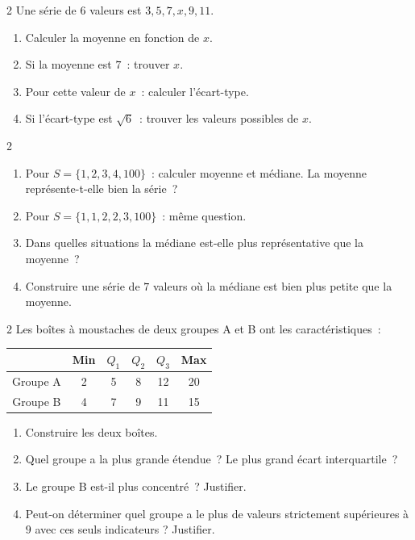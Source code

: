 \begin{exo}{2}
Une s\'erie de $6$ valeurs est $3, 5, 7, x, 9, 11$.
\begin{enumerate}
  \item Calculer la moyenne en fonction de $x$.
  \item Si la moyenne est $7$~: trouver $x$.
  \item Pour cette valeur de $x$~: calculer l'\'ecart-type.
  \item Si l'\'ecart-type est $\sqrt{6}$~: trouver les valeurs possibles de $x$.
\end{enumerate}
\end{exo}

\begin{exo}{2}
\begin{enumerate}
  \item Pour $S=\{1, 2, 3, 4, 100\}$~: calculer moyenne et m\'ediane.
        La moyenne repr\'esente-t-elle bien la s\'erie~?
  \item Pour $S=\{1, 1, 2, 2, 3, 100\}$~: m\^eme question.
  \item Dans quelles situations la m\'ediane est-elle plus repr\'esentative
        que la moyenne~?
  \item Construire une s\'erie de $7$ valeurs o\`u la m\'ediane est bien
        plus petite que la moyenne.
\end{enumerate}
\end{exo}

\begin{exo}{2}
Les bo\^ites \`a moustaches de deux groupes A et B ont les caract\'eristiques~:
\begin{center}
\begin{tabular}{|c|ccccc|}
\hline
\rowcolor{BN!10} & Min & $Q_1$ & $Q_2$ & $Q_3$ & Max \\
\hline
Groupe A & 2 & 5 & 8 & 12 & 20 \\
Groupe B & 4 & 7 & 9 & 11 & 15 \\
\hline
\end{tabular}
\end{center}
\begin{enumerate}
  \item Construire les deux bo\^ites.
  \item Quel groupe a la plus grande \'etendue~? Le plus grand \'ecart interquartile~?
  \item Le groupe B est-il plus concentr\'e~? Justifier.
  \item Peut-on d\'eterminer quel groupe a le plus de valeurs strictement
        sup\'erieures \`a $9$ avec ces seuls indicateurs ? Justifier.
\end{enumerate}
\end{exo}

